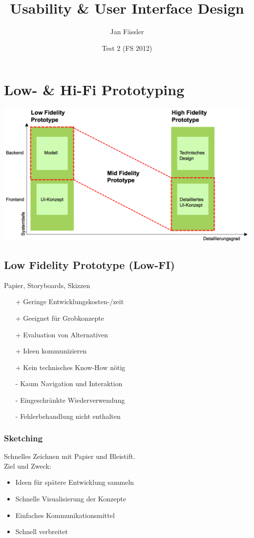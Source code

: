\documentclass[a4paper,10pt]{article}
\title{Usability \& User Interface Design}
\author{Jan F\"assler}
\date{Test 2  (FS 2012)}
\begin{document}
\maketitle
\thispagestyle{fancy}

\newpage


\tableofcontents	  	


\newpage
\setcounter{page}{1}

\section{Low- \& Hi-Fi Prototyping}

\includegraphics[scale=0.4]{prototyping.png}

\subsection{Low Fidelity Prototype (Low-FI)}
Papier, Storyboards, Skizzen 
\begin{itemize}
	\item[+] Geringe Entwicklungskosten-/zeit
	\item[+] Geeignet für Grobkonzepte
	\item[+] Evaluation von Alternativen
	\item[+] Ideen kommunizieren
	\item[+] Kein technisches Know-How n\"otig
	\item[-]  Kaum Navigation und Interaktion
	\item[-] Eingeschr\"ankte Wiederverwendung
	\item[-] Fehlerbehandlung nicht enthalten
\end{itemize}

\subsubsection{Sketching}
Schnelles Zeichnen mit Papier und Bleistift. \\
Ziel und Zweck:
\begin{itemize}
	\item Ideen für sp\"atere Entwicklung sammeln
	\item Schnelle Visualisierung der Konzepte
	\item Einfaches Kommunikationsmittel
	\item Schnell verbreitet
\end{itemize}
\end{document}
